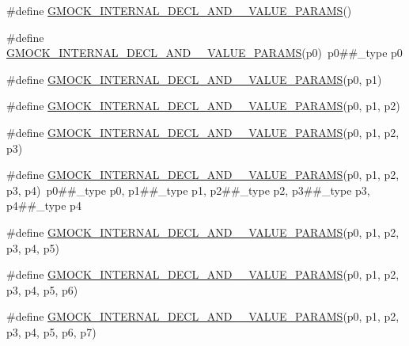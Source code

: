 \begin{DoxyCompactItemize}
\item 
\#define \hyperlink{gmock-generated-actions_8h_afbcc498768661d32cb658a8eb28535a9}{G\+M\+O\+C\+K\+\_\+\+I\+N\+T\+E\+R\+N\+A\+L\+\_\+\+D\+E\+C\+L\+\_\+\+A\+N\+D\+\_\+\_\+\+V\+A\+L\+U\+E\+\_\+\+P\+A\+R\+A\+MS}()
\item 
\#define \hyperlink{gmock-generated-actions_8h_a4440fd8222dde30e41f05209f06a2d00}{G\+M\+O\+C\+K\+\_\+\+I\+N\+T\+E\+R\+N\+A\+L\+\_\+\+D\+E\+C\+L\+\_\+\+A\+N\+D\+\_\+\_\+\+V\+A\+L\+U\+E\+\_\+\+P\+A\+R\+A\+MS}(p0)~p0\#\#\+\_\+type p0
\item 
\#define \hyperlink{gmock-generated-actions_8h_ab11df3777b85b01132aa4057017b22ca}{G\+M\+O\+C\+K\+\_\+\+I\+N\+T\+E\+R\+N\+A\+L\+\_\+\+D\+E\+C\+L\+\_\+\+A\+N\+D\+\_\+\_\+\+V\+A\+L\+U\+E\+\_\+\+P\+A\+R\+A\+MS}(p0,  p1)
\item 
\#define \hyperlink{gmock-generated-actions_8h_a81147c9dca4694a07acccd9324990585}{G\+M\+O\+C\+K\+\_\+\+I\+N\+T\+E\+R\+N\+A\+L\+\_\+\+D\+E\+C\+L\+\_\+\+A\+N\+D\+\_\+\_\+\+V\+A\+L\+U\+E\+\_\+\+P\+A\+R\+A\+MS}(p0,  p1,  p2)
\item 
\#define \hyperlink{gmock-generated-actions_8h_a0580c33b8405f1820a382f9b9471f157}{G\+M\+O\+C\+K\+\_\+\+I\+N\+T\+E\+R\+N\+A\+L\+\_\+\+D\+E\+C\+L\+\_\+\+A\+N\+D\+\_\+\_\+\+V\+A\+L\+U\+E\+\_\+\+P\+A\+R\+A\+MS}(p0,  p1,  p2,  p3)
\item 
\#define \hyperlink{gmock-generated-actions_8h_a0fd289b917553899d908b0f406f8f75d}{G\+M\+O\+C\+K\+\_\+\+I\+N\+T\+E\+R\+N\+A\+L\+\_\+\+D\+E\+C\+L\+\_\+\+A\+N\+D\+\_\+\_\+\+V\+A\+L\+U\+E\+\_\+\+P\+A\+R\+A\+MS}(p0,  p1,  p2,  p3,  p4)~p0\#\#\+\_\+type p0, p1\#\#\+\_\+type p1, p2\#\#\+\_\+type p2, p3\#\#\+\_\+type p3, p4\#\#\+\_\+type p4
\item 
\#define \hyperlink{gmock-generated-actions_8h_a80b3221bf467d72d15120045c9f52a6e}{G\+M\+O\+C\+K\+\_\+\+I\+N\+T\+E\+R\+N\+A\+L\+\_\+\+D\+E\+C\+L\+\_\+\+A\+N\+D\+\_\+\_\+\+V\+A\+L\+U\+E\+\_\+\+P\+A\+R\+A\+MS}(p0,  p1,  p2,  p3,  p4,  p5)
\item 
\#define \hyperlink{gmock-generated-actions_8h_af762ce6b60357100fd2c8176ef2f4102}{G\+M\+O\+C\+K\+\_\+\+I\+N\+T\+E\+R\+N\+A\+L\+\_\+\+D\+E\+C\+L\+\_\+\+A\+N\+D\+\_\+\_\+\+V\+A\+L\+U\+E\+\_\+\+P\+A\+R\+A\+MS}(p0,  p1,  p2,  p3,  p4,  p5,  p6)
\item 
\#define \hyperlink{gmock-generated-actions_8h_a3ce778c4907edf2818c948a78a94760a}{G\+M\+O\+C\+K\+\_\+\+I\+N\+T\+E\+R\+N\+A\+L\+\_\+\+D\+E\+C\+L\+\_\+\+A\+N\+D\+\_\+\_\+\+V\+A\+L\+U\+E\+\_\+\+P\+A\+R\+A\+MS}(p0,  p1,  p2,  p3,  p4,  p5,  p6,  p7)

\end{DoxyCompactItemize}
